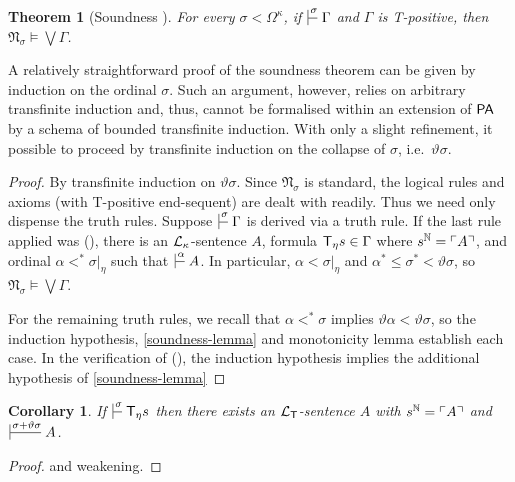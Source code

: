 \documentclass[UKenglish,cleveref,DIV=12]{scrartcl}
\newtheorem{theorem}{Theorem}[section]
\newtheorem{corollary}[lemma]{Corollary}
\theoremstyle{definition}
\theoremstyle{definition}
\begin{document}
\begin{theorem}[Soundness ]\label{soundness-thm}
	For every $\sigma < \Omega^\kappa $,
	if\/ $\prov\sigma\Gamma$ and $\Gamma$ is T-positive, then \( \mathfrak N_{\sigma}\models\bigvee\Gamma \).
\end{theorem}
A relatively straightforward proof of the soundness theorem can be given by induction on the ordinal \( \sigma \). Such an argument, however, relies on arbitrary transfinite induction and, thus, cannot be formalised within an extension of \( \mathsf{PA} \) by a schema of bounded transfinite induction.
With only a slight refinement, it possible to proceed by transfinite induction on the collapse of \( \sigma \), i.e.\ \( \vartheta\sigma \).
\begin{proof}
	By transfinite induction on $\vartheta \sigma $.
	Since $\mathfrak N_\sigma$ is standard, the logical rules and axioms (with T-positive end-sequent) are dealt with readily.
	Thus we need only dispense the truth rules. 
	Suppose $\prov\sigma \Gamma$ is derived via a truth rule. 
	If the last rule applied was (\Nec\eta), there is an $\mathcal{L}_\kappa$-sentence $A$, formula $\mathsf{T}_\eta s \in \Gamma$ where $s^\mathbb N=\ulcorner{A}\urcorner$, and ordinal $\alpha <^* \sigma |_\eta $ such that $\prov\alpha A$.
	In particular, \( \alpha < \sigma|_\eta \) and \( \alpha^* \le \sigma^* < \vartheta \sigma \), so \( \mathfrak N_\sigma \models \bigvee\Gamma\).

	For the remaining truth rules, we recall that \( \alpha <^* \sigma \) implies \( \vartheta \alpha < \vartheta \sigma \), so the induction hypothesis, \cref{soundness-lemma} and monotonicity lemma establish each case.
	In the verification of (\Del\eta), the induction hypothesis implies the additional hypothesis of \cref{soundness-lemma}
\end{proof}


\begin{corollary}\label{conec-thm}%
If\/ $\prov \sigma {\T_\eta s}$ then there exists an $\mathcal{L}_{\mathsf{T}}$-sentence $A$ with $s^\mathbb N=\ulcorner{A}\urcorner$ and $\prov {\sigma + \vartheta \sigma } A$.
\end{corollary}
\begin{proof} 
	 and weakening.
\end{proof}
\end{document}
